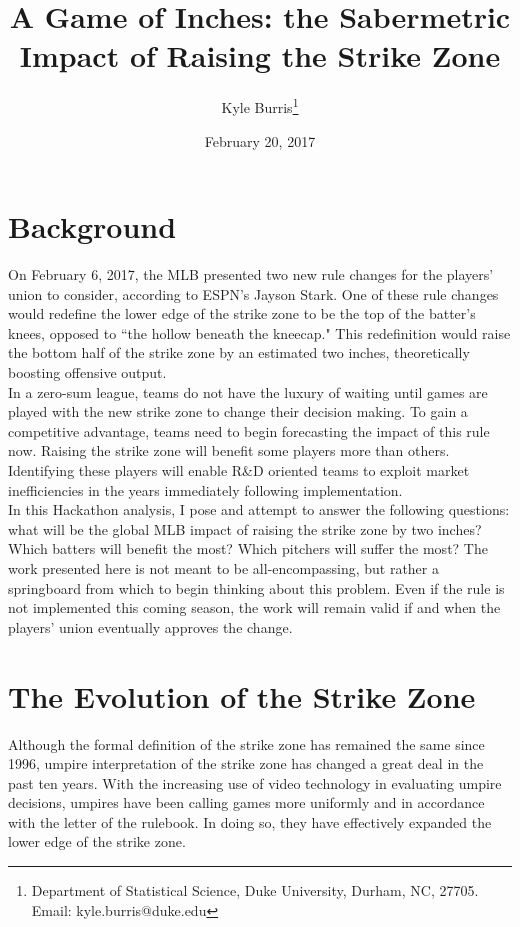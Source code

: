 \documentclass[11pt]{article}
\title{A Game of Inches: the Sabermetric Impact of Raising the Strike Zone }
\author{Kyle Burris\footnote{Department of Statistical Science, Duke University, Durham, NC, 27705.  Email: kyle.burris@duke.edu}}
\date{February 20, 2017}
\begin{document}
\maketitle

\section{Background}
On February 6, 2017, the MLB presented two new rule changes for the players' union to consider, according to ESPN's Jayson Stark.  One of these rule changes would redefine the lower edge of the strike zone to be the top of the batter's knees, opposed to ``the hollow beneath the kneecap."  This redefinition would raise the bottom half of the strike zone by an estimated two inches, theoretically boosting offensive output.\\

In a zero-sum league, teams do not have the luxury of waiting until games are played with the new strike zone to change their decision making.  To gain a competitive advantage, teams need to begin forecasting the impact of this rule now.  Raising the strike zone will benefit some players more than others.  Identifying these players will enable R\&D oriented teams to exploit market inefficiencies in the years immediately following implementation.\\

In this Hackathon analysis, I pose and attempt to answer the following questions: what will be the global MLB impact of raising the strike zone by two inches?  Which batters will benefit the most?  Which pitchers will suffer the most?  The work presented here is not meant to be all-encompassing, but rather a springboard from which to begin thinking about this problem.  Even if the rule is not implemented this coming season, the work will remain valid if and when the players' union eventually approves the change.

\section{The Evolution of the Strike Zone}
Although the formal definition of the strike zone has remained the same since 1996, umpire interpretation of the strike zone has changed a great deal in the past ten years.  With the increasing use of video technology in evaluating umpire decisions, umpires have been calling games more uniformly and in accordance with the letter of the rulebook.  In doing so, they have effectively expanded the lower edge of the strike zone.\\
\end{document}
